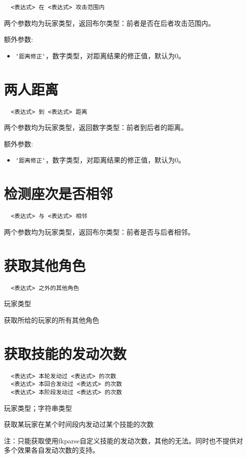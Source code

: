 \begin{verbatim}
  <表达式> 在 <表达式> 攻击范围内
\end{verbatim}

两个参数均为玩家类型，返回布尔类型：前者是否在后者攻击范围内。

额外参数:
\begin{itemize}
  \item \verb|'距离修正'|，数字类型，对距离结果的修正值，默认为0。
\end{itemize}

\section{两人距离}

\begin{verbatim}
  <表达式> 到 <表达式> 距离
\end{verbatim}

两个参数均为玩家类型，返回数字类型：前者到后者的距离。

额外参数:
\begin{itemize}
  \item \verb|'距离修正'|，数字类型，对距离结果的修正值，默认为0。
\end{itemize}

\section{检测座次是否相邻}

\begin{verbatim}
  <表达式> 与 <表达式> 相邻
\end{verbatim}

两个参数均为玩家类型，返回布尔类型：前者是否与后者相邻。

\section{获取其他角色}

\begin{verbatim}
  <表达式> 之外的其他角色
\end{verbatim}

玩家类型

获取所给的玩家的所有其他角色

\section{获取技能的发动次数}

\begin{verbatim}
  <表达式> 本轮发动过 <表达式> 的次数
  <表达式> 本回合发动过 <表达式> 的次数
  <表达式> 本阶段发动过 <表达式> 的次数
\end{verbatim}

玩家类型；字符串类型

获取某玩家在某个时间段内发动过某个技能的次数

注：只能获取使用fkparse自定义技能的发动次数，其他的无法。同时也不提供对多个效果各自发动次数的支持。

